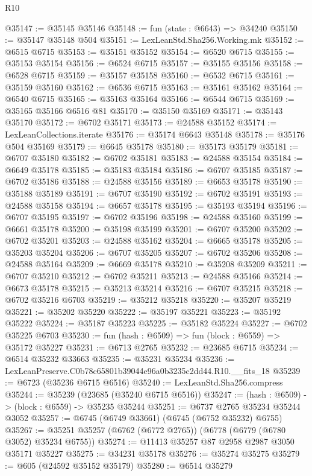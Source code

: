 \begin{lexlean}{R10}
\begin{coremodule}
@35147 := @35145 @35146
@35148 := fun (state : @6643) => @34240
@35150 := @35147 @35148 @504
@35151 := LexLeanStd.Sha256.Working.mk
@35152 := @6515 @6715
@35153 := @35151 @35152
@35154 := @6520 @6715
@35155 := @35153 @35154
@35156 := @6524 @6715
@35157 := @35155 @35156
@35158 := @6528 @6715
@35159 := @35157 @35158
@35160 := @6532 @6715
@35161 := @35159 @35160
@35162 := @6536 @6715
@35163 := @35161 @35162
@35164 := @6540 @6715
@35165 := @35163 @35164
@35166 := @6544 @6715
@35169 := @35165 @35166 @6516 @81
@35170 := @35150 @35169
@35171 := @35143 @35170
@35172 := @6702 @35171
@35173 := @24588 @35152
@35174 := LexLeanCollections.iterate
@35176 := @35174 @6643 @35148
@35178 := @35176 @504 @35169
@35179 := @6645 @35178
@35180 := @35173 @35179
@35181 := @6707 @35180
@35182 := @6702 @35181
@35183 := @24588 @35154
@35184 := @6649 @35178
@35185 := @35183 @35184
@35186 := @6707 @35185
@35187 := @6702 @35186
@35188 := @24588 @35156
@35189 := @6653 @35178
@35190 := @35188 @35189
@35191 := @6707 @35190
@35192 := @6702 @35191
@35193 := @24588 @35158
@35194 := @6657 @35178
@35195 := @35193 @35194
@35196 := @6707 @35195
@35197 := @6702 @35196
@35198 := @24588 @35160
@35199 := @6661 @35178
@35200 := @35198 @35199
@35201 := @6707 @35200
@35202 := @6702 @35201
@35203 := @24588 @35162
@35204 := @6665 @35178
@35205 := @35203 @35204
@35206 := @6707 @35205
@35207 := @6702 @35206
@35208 := @24588 @35164
@35209 := @6669 @35178
@35210 := @35208 @35209
@35211 := @6707 @35210
@35212 := @6702 @35211
@35213 := @24588 @35166
@35214 := @6673 @35178
@35215 := @35213 @35214
@35216 := @6707 @35215
@35218 := @6702 @35216 @6703
@35219 := @35212 @35218
@35220 := @35207 @35219
@35221 := @35202 @35220
@35222 := @35197 @35221
@35223 := @35192 @35222
@35224 := @35187 @35223
@35225 := @35182 @35224
@35227 := @6702 @35225 @6703
@35230 := fun (hash : @6509) => fun (block : @6559) => @35172 @35227
@35231 := @6713 @2765
@35232 := @23685 @6715
@35234 := @6514 @35232 @33663
@35235 := @35231 @35234
@35236 := LexLeanPreserve.C0b78c65801b39044e96a0b3235c2dd44.R10.__fits_18
@35239 := @6723 (@35236 @6715 @6516)
@35240 := LexLeanStd.Sha256.compress
@35244 := @35239 (@23685 (@35240 @6715 @6516))
@35247 := (hash : @6509) -> (block : @6559) -> @35235 @35244
@35251 := @6737 @2765 @35234 @35244 @3052
@35257 := @6745 (@6749 @33661) (@6745 (@6752 @35232) @6755)
@35267 := @35251 @35257 (@6762 (@6772 @2765)) (@6778 (@6779 (@6780 @3052) @35234 @6755))
@35274 := @11413 @35257 @87 @2958 @2987 @3050 @35171 @35227
@35275 := @34231 @35178
@35276 := @35274 @35275
@35279 := @605 (@24592 @35152 @35179)
@35280 := @6514 @35279

\end{coremodule}
\end{lexlean}
